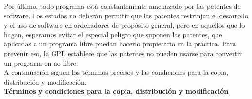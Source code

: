 Por último, todo programa está constantemente amenazado por las patentes de software. Los estados no deberán permitir que las patentes restrinjan el desarrollo y  el  uso  de  software  en  ordenadores  de  propósito  general,  pero  en  aquellos  que  lo hagan, esperamos evitar el especial peligro que suponen las patentes, que aplicadas
a un programa libre puedan hacerlo propietario en la práctica. Para prevenir eso, la GPL establece que las patentes no pueden usarse para convertir un programa en no-libre.\\

A continuación siguen los términos precisos y las condiciones para la copia, distribución y modificación.\\

\textbf{Términos y condiciones para la copia, distribución y modificación}

